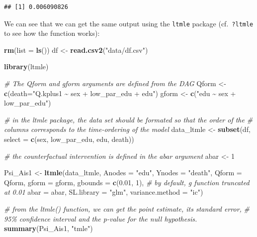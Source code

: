 \documentclass[
]{book}
\newenvironment{Shaded}{\begin{snugshade}}{\end{snugshade}}
\newcommand{\AttributeTok}[1]{\textcolor[rgb]{0.13,0.29,0.53}{#1}}
\newcommand{\CommentTok}[1]{\textcolor[rgb]{0.56,0.35,0.01}{\textit{#1}}}
\newcommand{\DecValTok}[1]{\textcolor[rgb]{0.00,0.00,0.81}{#1}}
\newcommand{\FloatTok}[1]{\textcolor[rgb]{0.00,0.00,0.81}{#1}}
\newcommand{\FunctionTok}[1]{\textcolor[rgb]{0.13,0.29,0.53}{\textbf{#1}}}
\newcommand{\NormalTok}[1]{#1}
\newcommand{\OtherTok}[1]{\textcolor[rgb]{0.56,0.35,0.01}{#1}}
\newcommand{\StringTok}[1]{\textcolor[rgb]{0.31,0.60,0.02}{#1}}
\begin{document}
\begin{verbatim}
## [1] 0.006090826
\end{verbatim}

We can see that we can get the same output using the \texttt{ltmle} package (cf.~\texttt{?ltmle} to see how the function works):

\begin{Shaded}
\begin{Highlighting}[]
\FunctionTok{rm}\NormalTok{(}\AttributeTok{list =} \FunctionTok{ls}\NormalTok{())}
\NormalTok{df }\OtherTok{\textless{}{-}} \FunctionTok{read.csv2}\NormalTok{(}\StringTok{"data/df.csv"}\NormalTok{)}

\FunctionTok{library}\NormalTok{(ltmle)}

\CommentTok{\# The Qform and gform arguments are defined from the DAG}
\NormalTok{Qform }\OtherTok{\textless{}{-}} \FunctionTok{c}\NormalTok{(}\AttributeTok{death=}\StringTok{"Q.kplus1 \textasciitilde{} sex + low\_par\_edu + edu"}\NormalTok{)}
\NormalTok{gform }\OtherTok{\textless{}{-}} \FunctionTok{c}\NormalTok{(}\StringTok{"edu \textasciitilde{} sex + low\_par\_edu"}\NormalTok{)}

\CommentTok{\# in the ltmle package, the data set should be formated so that the order of the }
\CommentTok{\# columns corresponds to the time{-}ordering of the model}
\NormalTok{data\_ltmle }\OtherTok{\textless{}{-}} \FunctionTok{subset}\NormalTok{(df, }
                     \AttributeTok{select =} \FunctionTok{c}\NormalTok{(sex, low\_par\_edu, edu, death))}

\CommentTok{\# the counterfactual intervention is defined in the abar argument}
\NormalTok{abar }\OtherTok{\textless{}{-}} \DecValTok{1}

\NormalTok{Psi\_Ais1 }\OtherTok{\textless{}{-}} \FunctionTok{ltmle}\NormalTok{(data\_ltmle,}
                  \AttributeTok{Anodes =} \StringTok{"edu"}\NormalTok{,}
                  \AttributeTok{Ynodes =} \StringTok{"death"}\NormalTok{,}
                  \AttributeTok{Qform =}\NormalTok{ Qform,}
                  \AttributeTok{gform =}\NormalTok{ gform,}
                  \AttributeTok{gbounds =} \FunctionTok{c}\NormalTok{(}\FloatTok{0.01}\NormalTok{, }\DecValTok{1}\NormalTok{), }\CommentTok{\# by default, g function truncated at 0.01}
                  \AttributeTok{abar =}\NormalTok{ abar,}
                  \AttributeTok{SL.library =} \StringTok{"glm"}\NormalTok{,}
                  \AttributeTok{variance.method =} \StringTok{"ic"}\NormalTok{)}

\CommentTok{\# from the ltmle() function, we can get the point estimate, its standard error, }
\CommentTok{\# 95\% confidence interval and the p{-}value for the null hypothesis.}
\FunctionTok{summary}\NormalTok{(Psi\_Ais1, }\StringTok{"tmle"}\NormalTok{)}
\end{Highlighting}
\end{Shaded}
\end{document}
